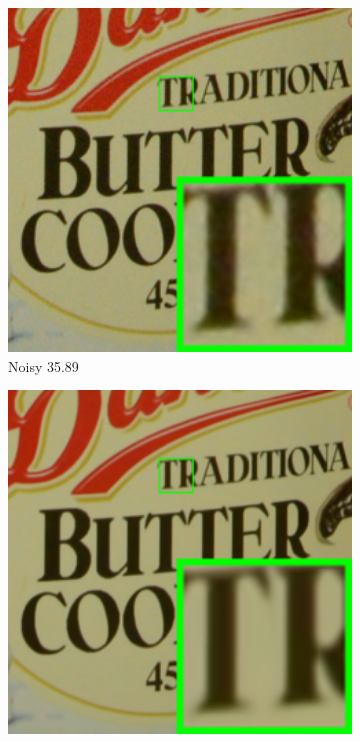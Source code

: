 \begin{figure}
    \centering
    \begin{subfigure}[t]{0.19\textwidth}
        \centering
        \includegraphics[width=1\textwidth]{images/guided/resize_br_Noisy_CC_Noisy_Nikon_D600_ISO_3200_C1_96.png}
		\caption{Noisy 35.89}
    \end{subfigure}
    \hfill
    \begin{subfigure}[t]{0.19\textwidth}
        \centering
        \includegraphics[width=1\textwidth]{images/guided/resize_br_Offline_CC_Noisy_Nikon_D600_ISO_3200_C1_96.png}

\end{subfigure}
\end{figure}
